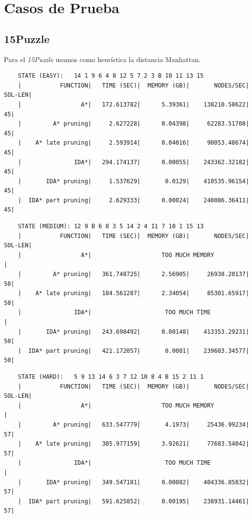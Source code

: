 \documentclass[a4paper,10pt]{article}
\begin{document}
\section{Casos de Prueba}
  \subsection{15Puzzle}
    Para el \textit{15Puzzle} usamos como heur\'istica la distancia Manhattan.

    
    \begin{verbatim}
    STATE (EASY):   14 1 9 6 4 8 12 5 7 2 3 B 10 11 13 15
    |           FUNCTION|   TIME (SEC)|  MEMORY (GB)|       NODES/SEC|    SOL-LEN|
    |                 A*|   172.613782|      5.39361|    138210.58622|         45|
    |         A* pruning|     2.627228|      0.04398|     62283.51708|         45|
    |    A* late pruning|     2.593914|      0.04016|     90053.48674|         45|
    |               IDA*|   294.174137|      0.00055|    243362.32182|         45|
    |       IDA* pruning|     1.537629|       0.0129|    410535.96154|         45|
    |  IDA* part pruning|     2.629333|      0.00024|    240086.36411|         45|
    \end{verbatim}        
    
    \begin{verbatim}  
    STATE (MEDIUM): 12 9 B 6 8 3 5 14 2 4 11 7 10 1 15 13                                                                                       
    |           FUNCTION|   TIME (SEC)|  MEMORY (GB)|       NODES/SEC|    SOL-LEN|
    |                 A*|                    TOO MUCH MEMORY                     |
    |         A* pruning|   361.748725|      2.56905|     26938.20137|         50|
    |    A* late pruning|   184.561287|      2.34054|     85301.65917|         50|
    |               IDA*|                     TOO MUCH TIME                      |
    |       IDA* pruning|   243.698492|      0.00148|    413353.29231|         50|
    |  IDA* part pruning|   421.172057|       0.0001|    239603.34577|         50|
    \end{verbatim}

    \begin{verbatim}  
    STATE (HARD):   5 9 13 14 6 3 7 12 10 8 4 B 15 2 11 1                                                                                     
    |           FUNCTION|   TIME (SEC)|  MEMORY (GB)|       NODES/SEC|    SOL-LEN|
    |                 A*|                    TOO MUCH MEMORY                     |  
    |         A* pruning|   633.547779|       4.1973|     25436.99234|         57|
    |    A* late pruning|   305.977159|      3.92621|     77683.54042|         57|
    |               IDA*|                     TOO MUCH TIME                      |
    |       IDA* pruning|   349.547181|      0.00082|    404336.85832|         57|
    |  IDA* part pruning|   591.625852|      0.00195|    238931.14461|         57|
      \end{verbatim}
\end{document}

